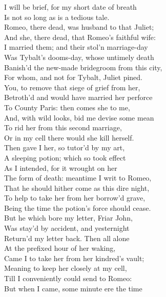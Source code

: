 \begin{speech}
I will be brief, for my short date of breath \\

Is not so long as is a tedious tale. \\
Romeo, there dead, was husband to that Juliet; \\
And she, there dead, that Romeo's faithful wife: \\
I married them; and their stol'n marriage-day \\
Was Tybalt's dooms-day, whose untimely death \\
Banish'd the new-made bridegroom from this city, \\
For whom, and not for Tybalt, Juliet pined. \\
You, to remove that siege of grief from her, \\
Betroth'd and would have married her perforce \\
To County Paris: then comes she to me, \\
And, with wild looks, bid me devise some mean \\
To rid her from this second marriage, \\
Or in my cell there would she kill herself. \\
Then gave I her, so tutor'd by my art, \\
A sleeping potion; which so took effect \\
As I intended, for it wrought on her \\
The form   of death: meantime I writ to Romeo, \\
That he should hither come as this dire night, \\
To help to take her from her borrow'd grave, \\
Being the time the potion's force should cease. \\
But he which bore my letter, Friar John, \\
Was stay'd by accident, and yesternight \\
Return'd my letter back. Then all alone \\
At the prefixed hour of her waking, \\
Came I to take her from her kindred's vault; \\
Meaning to keep her closely at my cell, \\
Till I conveniently could send to Romeo: \\
But when I came, some minute ere the time \\

\end{speech}
